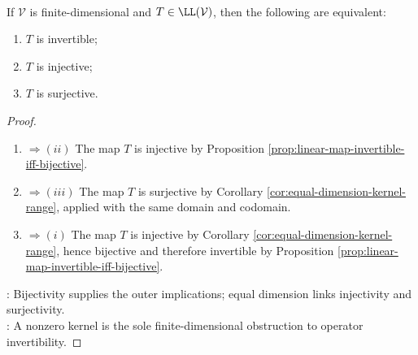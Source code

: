 \pagebreak
\begin{theorem} \label{thm:finite-dimensional-operator-invertible-equivalences} \\
If $\mathcal{V}$ is finite-dimensional and $T\in\LL(\mathcal{V})$, then the following are equivalent:
\begin{enumerate}[label=(\roman*)]
\setlength{\itemsep}{0pt}
\item $T$ is invertible;
\item $T$ is injective;
\item $T$ is surjective.
\end{enumerate}
\begin{proof}
\begin{enumerate}[label=(\roman*)]
\setlength{\itemsep}{0pt}
\item[$(i)$] $\Rightarrow (ii)$ The map $T$ is injective by Proposition \ref{prop:linear-map-invertible-iff-bijective}.
\item[$(ii)$] $\Rightarrow (iii)$ The map $T$ is surjective by Corollary \ref{cor:equal-dimension-kernel-range}, applied with the same domain and codomain.
\item[$(iii)$] $\Rightarrow (i)$ The map $T$ is injective by Corollary \ref{cor:equal-dimension-kernel-range}, hence bijective and therefore invertible by Proposition \ref{prop:linear-map-invertible-iff-bijective}.
\end{enumerate}
: Bijectivity supplies the outer implications; equal dimension links injectivity and surjectivity.\\
: A nonzero kernel is the sole finite-dimensional obstruction to operator invertibility.
\end{proof}
\end{theorem}

